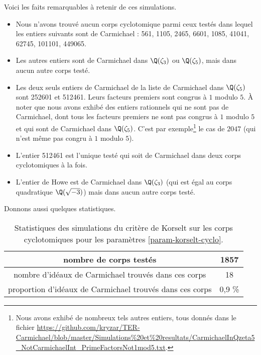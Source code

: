 Voici les faits remarquables à retenir de ces simulations.
	\begin{itemize}
		\item Nous n'avons trouvé aucun corps cyclotomique parmi ceux testés dans lequel les entiers suivants sont de Carmichael : 561, 1105, 2465, 6601, 1085, 41041, 62745, 101101, 449065.
		\item Les autres entiers sont de Carmichael dans $\Q(\zeta_3)$ ou $\Q(\zeta_5)$, mais dans aucun autre corps testé.
		\item Les deux seuls entiers de Carmichael de la liste de Carmichael dans $\Q(\zeta_5)$ sont 252601 et 512461. Leurs facteurs premiers sont congrus à $1$ modulo $5$. À noter que nous avons exhibé des entiers rationnels qui ne sont pas de Carmichael, dont tous les facteurs premiers ne sont pas congrus à $1$ modulo $5$ et qui sont de Carmichael dans $\Q(\zeta_5)$. C'est par exemple\footnote{Nous avons exhibé de nombreux tels autres entiers, tous donnés dans le fichier \url{https://github.com/kryzar/TER-Carmichael/blob/master/Simulations\%20et\%20resultats/CarmichaelInQzeta5\_NotCarmichaelInt\_PrimeFactorsNot1mod5.txt}.} le cas de $2047$ (qui n'est même pas congru à $1$ modulo $5$).
		\item L'entier 512461 est l'unique testé qui soit de Carmichael dans deux corps cyclotomiques à la fois.
		\item L'entier de Howe est de Carmichael dans $\Q(\zeta_3)$ (qui est égal au corps quadratique $\Q(\sqrt{-3})$) mais dans aucun autre corps testé.
	\end{itemize}

Donnons aussi quelques statistiques.

\begin{table}[H]\label{statistiques-cyclo}
	\begin{center}
		\begin{tabular}{|c|c|}
			\hline
			nombre de corps testés & 1857 \\\hline
			nombre d'idéaux de Carmichael trouvés dans ces corps & 18 \\\hline
			proportion d'idéaux de Carmichael trouvés dans ces corps & 0,9 \% \\\hline
		\end{tabular}
		\caption{Statistiques des simulations du critère de Korselt sur les corps cyclotomiques pour les paramètres \ref{param-korselt-cyclo}.}
	\end{center}
\end{table}

